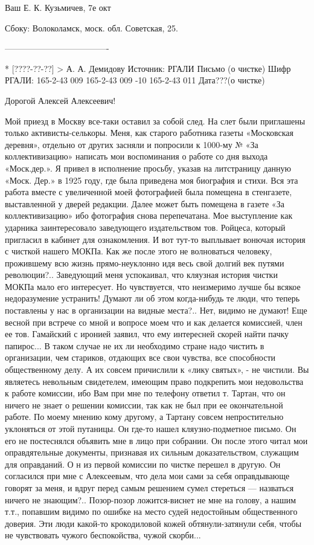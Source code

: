\documentclass[]{memoir}
\begin{document}
Ваш Е. К. Кузьмичев, 7е окт

Сбоку: Волоколамск, моск. обл. Советская, 25.

-------------------------------------

* [????-??-??] > А. А. Демидову 
Источник: РГАЛИ
Письмо (о чистке)
Шифр РГАЛИ:     165-2-43 009
                165-2-43 009 -10
                165-2-43 011
                                                                                                                Дата???(о чистке)

                                                              Дорогой
                                            Алексей Алексеевич!

Мой приезд в Москву все-таки оставил за собой след. На слет были приглашены только активисты-селькоры. Меня, как старого работника газеты «Московская деревня», отдельно от других засняли и попросили к 1000-му № «За коллективизацию» написать мои воспоминания о работе со дня выхода «Моск.дер.». Я привел в исполнение просьбу, указав на 
литстраницу данную «Моск. Дер.» в 1925 году, где была приведена моя биография и стихи. Вся эта работа вместе с увеличенной моей фотографией была помещена в стенгазете, выставленной у дверей редакции. Далее может быть помещена в газете «За коллективизацию» ибо фотография снова перепечатана.
Мое выступление как ударника заинтересовало заведующего издательством тов. Ройцеса, который пригласил в кабинет для ознакомления. И вот тут-то выплывает вонючая история с чисткой нашего МОКПа. Как же после этого не волноваться человеку, прожившему всю жизнь прямо-неуклонно идя весь свой долгий век путями революции?.. Заведующий меня успокаивал, что кляузная история чистки МОКПа мало его интересует. Но чувствуется, что неизмеримо лучше бы всякое недоразумение устранить!
Думают ли об этом когда-нибудь те люди, что теперь поставлены у нас в организации на видные места?.. Нет, видимо не думают! Еще весной при встрече со мной и вопросе моем что и как делается комиссией, член ее тов. Гамайский с иронией заявил, что ему интересней скорей найти пачку папирос... В таком случае не их ли необходимо стране надо чистить в организации, чем стариков, отдающих все свои чувства, все способности общественному делу. А их совсем причислили к «лику святых», - не чистили. Вы являетесь невольным свидетелем, имеющим право подкрепить мои недовольства к работе комиссии, ибо Вам при мне по телефону ответил т. Тартан, что он ничего не знает о решении комиссии, так как не был при ее окончательной работе. По моему мнению кому другому, а Тартану совсем непростительно уклоняться от этой путаницы. Он где-то нашел кляузно-подметное письмо. Он его не постеснялся объявить мне в лицо при собрании. Он после этого читал мои оправдятельные документы, признавая их сильным доказательством, служащим для оправданий. О н из первой комиссии по чистке перешел в другую. Он согласился при мне с Алексеевым, что дела мои сами за себя оправдывающе говорят за меня, и вдруг перед самым решением сумел стереться — назваться ничего не знающим?.. Позор-позор ложится-виснет не мне на голову, а нашим т.т., попавшим видимо по ошибке на место судей недостойным общественного доверия. Эти люди какой-то крокодиловой кожей обтянули-затянули себя, чтобы не чувствовать чужого беспокойства, чужой скорби...
\end{document}
